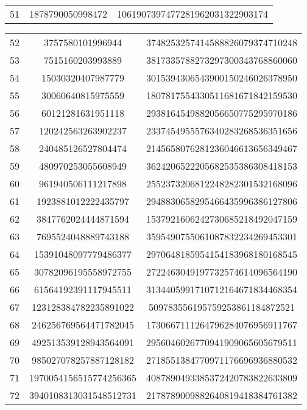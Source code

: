 \documentclass[fleqn]{article}
\begin{document}
\begin{center}
\begin{tabular}{c | c | c}
            51 & 1878790050998472 & 1061907397477281962031322903174 \\
        \end{tabular}
        \newpage
        \begin{tabular}{c | c | c}
            52 & 3757580101996944 & 3748253257414588826079374710248 \\
            53 & 7515160203993889 & 3817335788273297300343768860060 \\
            54 & 15030320407987779 & 3015394306543900150246026378950 \\
            55 & 30060640815975559 & 1807817554330511681671842159530 \\
            56 & 60121281631951118 & 2938164549882056650775295970186 \\
            57 & 120242563263902237 & 2337454955576340283268536351656 \\
            58 & 240485126527804474 & 2145658076281236046613656349467 \\
            59 & 480970253055608949 & 3624206522205682535386308418153 \\
            60 & 961940506111217898 & 2552373206812248282301532168096 \\
            61 & 1923881012222435797 & 2948830658295466435996386127806 \\
            62 & 3847762024444871594 & 1537921606242730685218492047159 \\
            63 & 7695524048889743188 & 3595490755061087832234269453301 \\
            64 & 15391048097779486377 & 2970648185954154183968180168545 \\
            65 & 30782096195558972755 & 2722463049197732574614096564190 \\
            66 & 61564192391117945511 & 3134405991710712164671834468354 \\
            67 & 123128384782235891022 & 509783556195759253861184872521 \\
            68 & 246256769564471782045 & 1730667111264796284076956911767 \\
            69 & 492513539128943564091 & 2956046026770941909065605679511 \\
            70 & 985027078257887128182 & 2718551384770971176696936880532 \\
            71 & 1970054156515774256365 & 4087890493385372420783822633809 \\
            72 & 3940108313031548512731 & 2178789009882640819418384761382 \\

\end{tabular}
\end{center}
\end{document}
